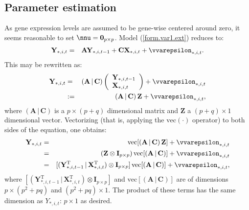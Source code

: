 \documentclass[a4paper]{article}
\theoremstyle{myexamplestyle}
\begin{document}
\subsection{Parameter estimation}
As gene expression levels are assumed to be gene-wise centered around zero, it seems reasonable to set $\nnu = \mathbf{0}_{p \times p}$. Model (\ref{form.var1.ext}) reduces to:
\begin{eqnarray*}
\mathbf{Y}_{\ast,i,t} %
& = & \mathbf{A} \mathbf{Y}_{\ast,i,t-1}
+ \mathbf{C} \mathbf{X}_{\ast,i,t} + \vvarepsilon_{\ast,i,t}.
\end{eqnarray*}
This may be rewritten as:
\begin{eqnarray*}
\mathbf{Y}_{\ast,i,t} & = & ( \mathbf{A} \, | \, \mathbf{C} ) \left(
\begin{array}{l}
\mathbf{Y}_{\ast,i,t-1}
\\
\mathbf{X}_{\ast,i,t}
\end{array} \right) + \vvarepsilon_{\ast,i,t}
\\
& := & ( \mathbf{A} \, | \, \mathbf{C} ) \, \mathbf{Z}  + \vvarepsilon_{\ast,i,t},
\end{eqnarray*}
where $( \mathbf{A} \, | \, \mathbf{C} )$ is a $p \times (p + q)$ dimensional matrix and $\mathbf{Z}$ a $(p+q) \times 1$ dimensional vector.
Vectorizing (that is, applying the $\mbox{vec}(\cdot)$ operator) to both sides of the equation, one obtains:
\begin{eqnarray*}
\mathbf{Y}_{\ast,i,t} & = & \mbox{vec}[( \mathbf{A} \, | \, \mathbf{C} ) \,   \mathbf{Z}]  + \vvarepsilon_{\ast,i,t}
\\
& = & (\mathbf{Z} \otimes \mathbf{I}_{p \times p}) \, \mbox{vec}[( \mathbf{A} \, | \, \mathbf{C} )]  + \vvarepsilon_{\ast,i,t}
\\
& = & [ (\mathbf{Y}_{\ast,i,t-1}^{\mathrm{T}} \, |  \, \mathbf{X}_{\ast,i,t}^{\mathrm{T}}) \otimes \mathbf{I}_{p \times p} ]  \, \mbox{vec}[( \mathbf{A} \, | \, \mathbf{C} )]  + \vvarepsilon_{\ast,i,t},
\end{eqnarray*}
where $[ (\mathbf{Y}_{\ast,i,t-1}^{\mathrm{T}} \, |  \, \mathbf{X}_{\ast,i,t}^{\mathrm{T}}) \otimes \mathbf{I}_{p \times p} ]$  and $\mbox{vec}[( \mathbf{A} \, | \, \mathbf{C} )]$ are of dimensions $p \times (p^2 + p q)$ and $(p^2 + p q) \times 1$. The product of these terms has the same dimension as $Y_{\ast, i, t}$: $p \times 1$ as desired.
\end{document}
